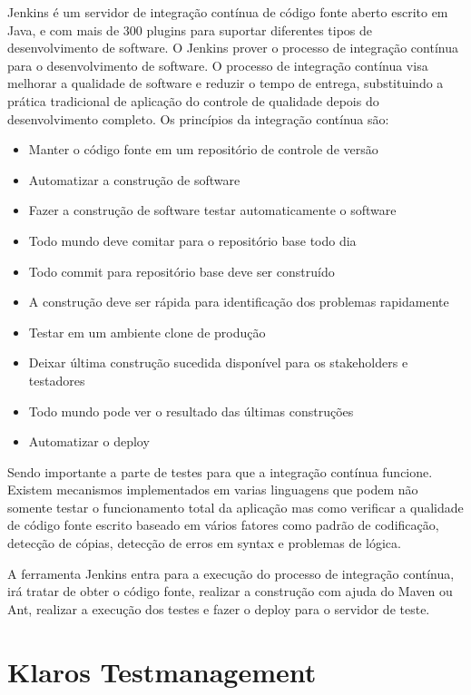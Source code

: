 \documentclass{abnt}
\begin{document}
				Jenkins é um servidor de integração contínua de código fonte aberto escrito em Java, e com mais de 300 plugins para
				suportar diferentes tipos de desenvolvimento de software. O Jenkins prover o processo de integração contínua para o
				desenvolvimento de software.
				O processo de integração contínua visa melhorar a qualidade de software e reduzir o tempo de entrega, substituindo a
				prática tradicional de aplicação do controle de qualidade depois do desenvolvimento completo. Os princípios da
				integração contínua são:
				\begin{itemize}
				  \item Manter o código fonte em um repositório de controle de versão
				  \item Automatizar a construção de software
				  \item Fazer a construção de software testar automaticamente o software
				  \item Todo mundo deve comitar para o repositório base todo dia
				  \item Todo commit para repositório base deve ser construído
				  \item A construção deve ser rápida para identificação dos problemas rapidamente
				  \item Testar em um ambiente clone de produção
				  \item Deixar última construção sucedida disponível para os stakeholders e testadores
				  \item Todo mundo pode ver o resultado das últimas construções
				  \item Automatizar o deploy
				\end{itemize}
				
				Sendo importante a parte de testes para que a integração contínua funcione. Existem mecanismos implementados em
				varias linguagens que podem não somente testar o funcionamento total da aplicação mas como verificar a qualidade de
				código fonte escrito baseado em vários fatores como padrão de codificação, detecção de cópias, detecção de erros em
				syntax e problemas de lógica.
				
				A ferramenta Jenkins entra para a execução do processo de integração contínua, irá tratar de obter o código fonte,
				realizar a construção com ajuda do Maven ou Ant, realizar a execução dos testes e fazer o deploy para o servidor de
				teste.

		\section{Klaros Testmanagement}
		
\end{document}
